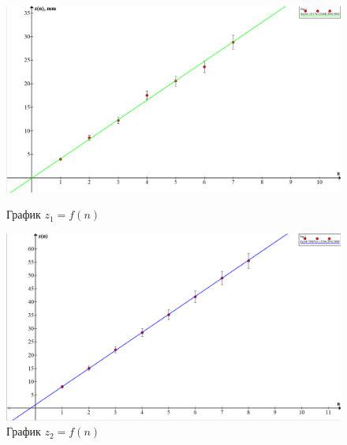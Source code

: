 \documentclass[15pt,a5paper,reqno]{article}
\begin{document}
\begin{figure}[h!]
  \begin{minipage}[b]{0.8\textwidth}
      \includegraphics[width=\textwidth]{pics/lab_436_1.png}
      \caption{График $z_1 = f(n)$}
  \end{minipage}

  \begin{minipage}[b]{0.8\textwidth}

      \includegraphics[width=\textwidth]{pics/lab_436_2.png}
      \caption{График $z_2 = f(n)$}
  \end{minipage}
  \end{figure}
\end{document}
